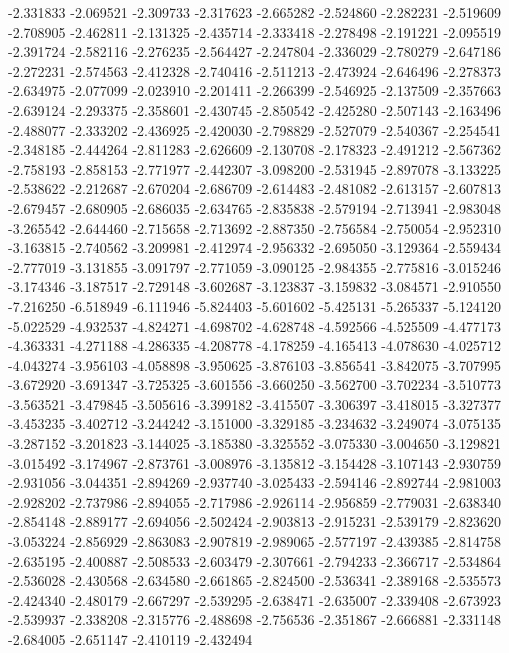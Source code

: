 -2.331833
-2.069521
-2.309733
-2.317623
-2.665282
-2.524860
-2.282231
-2.519609
-2.708905
-2.462811
-2.131325
-2.435714
-2.333418
-2.278498
-2.191221
-2.095519
-2.391724
-2.582116
-2.276235
-2.564427
-2.247804
-2.336029
-2.780279
-2.647186
-2.272231
-2.574563
-2.412328
-2.740416
-2.511213
-2.473924
-2.646496
-2.278373
-2.634975
-2.077099
-2.023910
-2.201411
-2.266399
-2.546925
-2.137509
-2.357663
-2.639124
-2.293375
-2.358601
-2.430745
-2.850542
-2.425280
-2.507143
-2.163496
-2.488077
-2.333202
-2.436925
-2.420030
-2.798829
-2.527079
-2.540367
-2.254541
-2.348185
-2.444264
-2.811283
-2.626609
-2.130708
-2.178323
-2.491212
-2.567362
-2.758193
-2.858153
-2.771977
-2.442307
-3.098200
-2.531945
-2.897078
-3.133225
-2.538622
-2.212687
-2.670204
-2.686709
-2.614483
-2.481082
-2.613157
-2.607813
-2.679457
-2.680905
-2.686035
-2.634765
-2.835838
-2.579194
-2.713941
-2.983048
-3.265542
-2.644460
-2.715658
-2.713692
-2.887350
-2.756584
-2.750054
-2.952310
-3.163815
-2.740562
-3.209981
-2.412974
-2.956332
-2.695050
-3.129364
-2.559434
-2.777019
-3.131855
-3.091797
-2.771059
-3.090125
-2.984355
-2.775816
-3.015246
-3.174346
-3.187517
-2.729148
-3.602687
-3.123837
-3.159832
-3.084571
-2.910550
-7.216250
-6.518949
-6.111946
-5.824403
-5.601602
-5.425131
-5.265337
-5.124120
-5.022529
-4.932537
-4.824271
-4.698702
-4.628748
-4.592566
-4.525509
-4.477173
-4.363331
-4.271188
-4.286335
-4.208778
-4.178259
-4.165413
-4.078630
-4.025712
-4.043274
-3.956103
-4.058898
-3.950625
-3.876103
-3.856541
-3.842075
-3.707995
-3.672920
-3.691347
-3.725325
-3.601556
-3.660250
-3.562700
-3.702234
-3.510773
-3.563521
-3.479845
-3.505616
-3.399182
-3.415507
-3.306397
-3.418015
-3.327377
-3.453235
-3.402712
-3.244242
-3.151000
-3.329185
-3.234632
-3.249074
-3.075135
-3.287152
-3.201823
-3.144025
-3.185380
-3.325552
-3.075330
-3.004650
-3.129821
-3.015492
-3.174967
-2.873761
-3.008976
-3.135812
-3.154428
-3.107143
-2.930759
-2.931056
-3.044351
-2.894269
-2.937740
-3.025433
-2.594146
-2.892744
-2.981003
-2.928202
-2.737986
-2.894055
-2.717986
-2.926114
-2.956859
-2.779031
-2.638340
-2.854148
-2.889177
-2.694056
-2.502424
-2.903813
-2.915231
-2.539179
-2.823620
-3.053224
-2.856929
-2.863083
-2.907819
-2.989065
-2.577197
-2.439385
-2.814758
-2.635195
-2.400887
-2.508533
-2.603479
-2.307661
-2.794233
-2.366717
-2.534864
-2.536028
-2.430568
-2.634580
-2.661865
-2.824500
-2.536341
-2.389168
-2.535573
-2.424340
-2.480179
-2.667297
-2.539295
-2.638471
-2.635007
-2.339408
-2.673923
-2.539937
-2.338208
-2.315776
-2.488698
-2.756536
-2.351867
-2.666881
-2.331148
-2.684005
-2.651147
-2.410119
-2.432494
